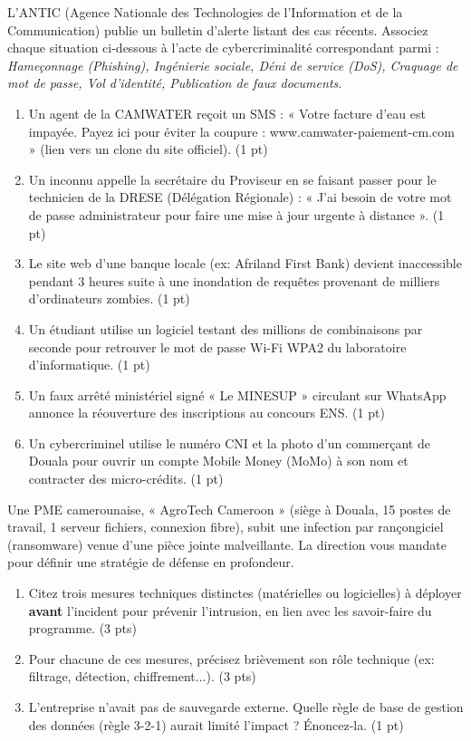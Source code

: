 \documentclass[11pt]{article}
\begin{document}
\begin{exercice}
L'ANTIC (Agence Nationale des Technologies de l'Information et de la Communication) publie un bulletin d'alerte listant des cas récents. Associez chaque situation ci-dessous à l'acte de cybercriminalité correspondant parmi : \textit{Hameçonnage (Phishing), Ingénierie sociale, Déni de service (DoS), Craquage de mot de passe, Vol d'identité, Publication de faux documents}.
\begin{enumerate}
    \item Un agent de la CAMWATER reçoit un SMS : « Votre facture d'eau est impayée. Payez ici pour éviter la coupure : www.camwater-paiement-cm.com » (lien vers un clone du site officiel). \hfill (1 pt)
    \item Un inconnu appelle la secrétaire du Proviseur en se faisant passer pour le technicien de la DRESE (Délégation Régionale) : « J'ai besoin de votre mot de passe administrateur pour faire une mise à jour urgente à distance ». \hfill (1 pt)
    \item Le site web d'une banque locale (ex: Afriland First Bank) devient inaccessible pendant 3 heures suite à une inondation de requêtes provenant de milliers d'ordinateurs zombies. \hfill (1 pt)
    \item Un étudiant utilise un logiciel testant des millions de combinaisons par seconde pour retrouver le mot de passe Wi-Fi WPA2 du laboratoire d'informatique. \hfill (1 pt)
    \item Un faux arrêté ministériel signé « Le MINESUP » circulant sur WhatsApp annonce la réouverture des inscriptions au concours ENS. \hfill (1 pt)
    \item Un cybercriminel utilise le numéro CNI et la photo d'un commerçant de Douala pour ouvrir un compte Mobile Money (MoMo) à son nom et contracter des micro-crédits. \hfill (1 pt)
\end{enumerate}
\end{exercice}

\begin{exercice}
Une PME camerounaise, « AgroTech Cameroon » (siège à Douala, 15 postes de travail, 1 serveur fichiers, connexion fibre), subit une infection par rançongiciel (ransomware) venue d'une pièce jointe malveillante. La direction vous mandate pour définir une stratégie de défense en profondeur.
\begin{enumerate}
    \item Citez trois mesures techniques distinctes (matérielles ou logicielles) à déployer \textbf{avant} l'incident pour prévenir l'intrusion, en lien avec les savoir-faire du programme. \hfill (3 pts)
    \item Pour chacune de ces mesures, précisez brièvement son rôle technique (ex: filtrage, détection, chiffrement...). \hfill (3 pts)
    \item L'entreprise n'avait pas de sauvegarde externe. Quelle règle de base de gestion des données (règle 3-2-1) aurait limité l'impact ? Énoncez-la. \hfill (1 pt)
\end{enumerate}
\end{exercice}
\end{document}
